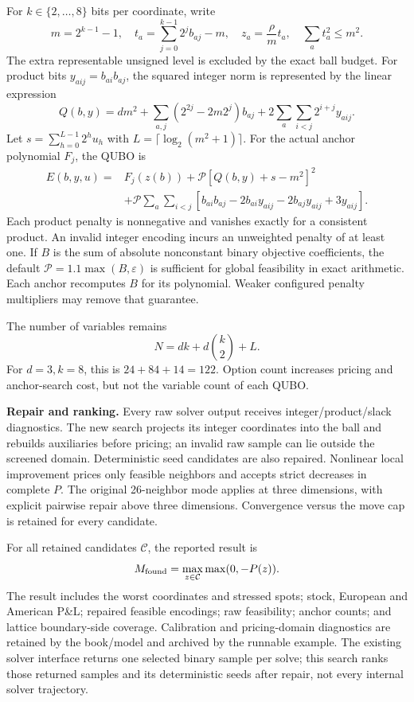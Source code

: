 \documentclass[11pt,a4paper]{article}
\begin{document}
For $k\in\{2,\ldots,8\}$ bits per coordinate, write
\[
 m=2^{k-1}-1,\quad t_a=\sum_{j=0}^{k-1}2^j b_{aj}-m,\quad
 z_a=\frac{\rho}{m}t_a,\quad \sum_a t_a^2\leq m^2.
\]
The extra representable unsigned level is excluded by the exact ball budget.
For product bits $y_{aij}=b_{ai}b_{aj}$, the squared integer norm is represented
by the linear expression
\[
 Q(b,y)=dm^2+\sum_{a,j}(2^{2j}-2m2^j)b_{aj}
             +2\sum_a\sum_{i<j}2^{i+j}y_{aij}.
\]
Let $s=\sum_{h=0}^{L-1}2^h u_h$ with $L=\lceil\log_2(m^2+1)\rceil$.
For the actual anchor polynomial $F_j$, the QUBO is
\begin{align*}
 E(b,y,u)={}&F_j(z(b))+\mathcal P[Q(b,y)+s-m^2]^2\\
 &+\mathcal P\sum_a\sum_{i<j}
 [b_{ai}b_{aj}-2b_{ai}y_{aij}-2b_{aj}y_{aij}+3y_{aij}].
\end{align*}
Each product penalty is nonnegative and vanishes exactly for a consistent
product. An invalid integer encoding incurs an unweighted penalty of at least
one. If $B$ is the sum of absolute nonconstant binary objective coefficients,
the default $\mathcal P=1.1\max(B,\varepsilon)$ is sufficient for global
feasibility in exact arithmetic. Each anchor recomputes $B$ for its polynomial.
Weaker configured penalty multipliers may remove that guarantee.

The number of variables remains
\[
 N=dk+d\binom{k}{2}+L.
\]
For $d=3,k=8$, this is $24+84+14=122$. Option count increases pricing and
anchor-search cost, but not the variable count of each QUBO.

\textbf{Repair and ranking.}
Every raw solver output receives integer/product/slack diagnostics. The new
search projects its integer coordinates into the ball and rebuilds auxiliaries
before pricing; an invalid raw sample can lie outside the screened domain.
Deterministic seed candidates are also repaired. Nonlinear local improvement
prices only feasible neighbors and accepts strict decreases in complete $P$.
The original 26-neighbor mode applies at three dimensions, with explicit
pairwise repair above three dimensions. Convergence versus the move cap is
retained for every candidate.

For all retained candidates $\mathcal C$, the reported result is
\[
 M_{\rm found}=\max_{z\in\mathcal C}\max(0,-P(z)).
\]
The result includes the worst coordinates and stressed spots; stock, European
and American P\&L; repaired feasible encodings; raw feasibility; anchor counts;
and lattice boundary-side coverage. Calibration and pricing-domain diagnostics
are retained by the book/model and archived by the runnable example.
The existing solver interface returns one selected binary sample per solve;
this search ranks those returned samples and its deterministic seeds after
repair, not every internal solver trajectory.
\end{document}
